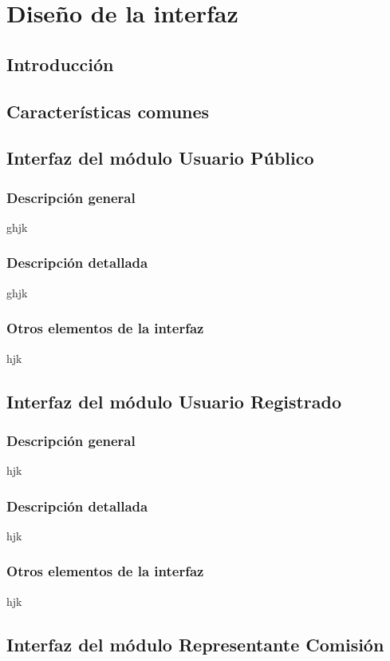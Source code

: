 \chapter{Diseño de la interfaz} \label{cap:diseño_interfaz}

\section{Introducción}

\section{Características comunes}

\section{Interfaz del módulo Usuario Público}
\subsection{Descripción general}
ghjk
\subsection{Descripción detallada}
ghjk
\subsection{Otros elementos de la interfaz}
hjk

\section{Interfaz del módulo Usuario Registrado}
\subsection{Descripción general}
hjk
\subsection{Descripción detallada}
hjk
\subsection{Otros elementos de la interfaz}
hjk

\section{Interfaz del módulo Representante Comisión}
